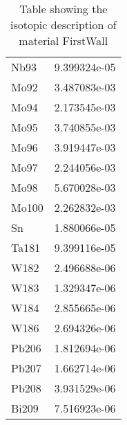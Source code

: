 \begin{centering}
\begin{table}[ht!]
\begin{tabular}{l | c}
Nb93 & 9.399324e-05\\
Mo92 & 3.487083e-03\\
Mo94 & 2.173545e-03\\
Mo95 & 3.740855e-03\\
Mo96 & 3.919447e-03\\
Mo97 & 2.244056e-03\\
Mo98 & 5.670028e-03\\
Mo100 & 2.262832e-03\\
Sn & 1.880066e-05\\
Ta181 & 9.399116e-05\\
W182 & 2.496688e-06\\
W183 & 1.329347e-06\\
W184 & 2.855665e-06\\
W186 & 2.694326e-06\\
Pb206 & 1.812694e-06\\
Pb207 & 1.662714e-06\\
Pb208 & 3.931529e-06\\
Bi209 & 7.516923e-06
\end{tabular}
\caption{Table showing the isotopic description of material FirstWall}
\label{table:material_FirstWall}
\end{table}\clearpage


\end{centering}

